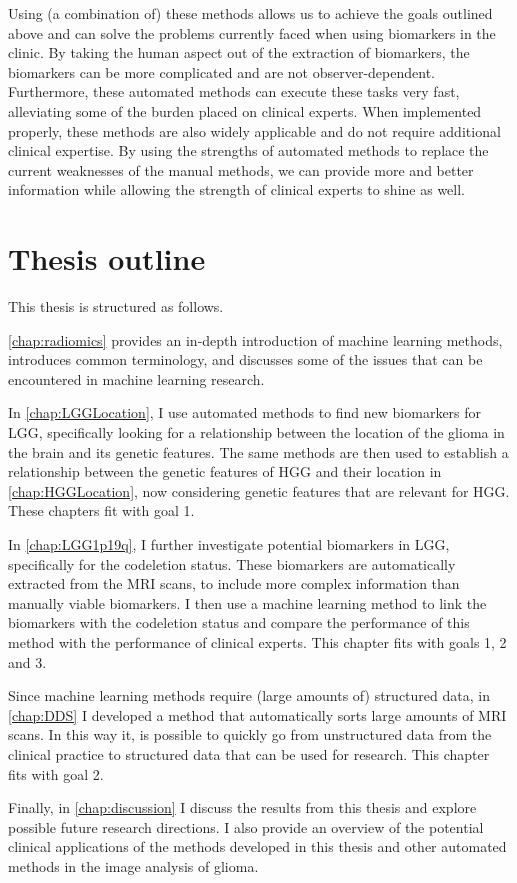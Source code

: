 Using (a combination of) these methods allows us to achieve the goals outlined above and can solve the problems currently faced when using biomarkers in the clinic.
By taking the human aspect out of the extraction of biomarkers, the biomarkers can be more complicated and are not observer-dependent.
Furthermore, these automated methods can execute these tasks very fast, alleviating some of the burden placed on clinical experts.
When implemented properly, these methods are also widely applicable and do not require additional clinical expertise.
By using the strengths of automated methods to replace the current weaknesses of the manual methods, we can provide more and better information while allowing the strength of clinical experts to shine as well.

\section{Thesis outline}

This thesis is structured as follows.

\cref{chap:radiomics} provides an in-depth introduction of machine learning methods, introduces common terminology, and discusses some of the issues that can be encountered in machine learning research.

In \cref{chap:LGGLocation}, I use automated methods to find new biomarkers for \gls{LGG}, specifically looking for a relationship between the location of the \gls{glioma} in the brain and its genetic features.
The same methods are then used to establish a relationship between the genetic features of \gls{HGG} and their location in \cref{chap:HGGLocation}, now considering genetic features that are relevant for \gls{HGG}.
These chapters fit with goal 1.

In \cref{chap:LGG1p19q}, I further investigate potential biomarkers in \gls{LGG}, specifically for the \gls{codeletion} status.
These biomarkers are automatically extracted from the \gls{MRI} scans, to include more complex information than manually viable biomarkers.
I then use a machine learning method to link the biomarkers with the \gls{codeletion} status and compare the performance of this method with the performance of clinical experts.
This chapter fits with goals 1, 2 and 3.

Since machine learning methods require (large amounts of) structured data, in \cref{chap:DDS} I developed a method that automatically sorts large amounts of \gls{MRI} scans.
In this way it, is possible to quickly go from unstructured data from the clinical practice to structured data that can be used for research.
This chapter fits with goal 2.

Finally, in \cref{chap:discussion} I discuss the results from this thesis and explore possible future research directions.
I also provide an overview of the potential clinical applications of the methods developed in this thesis and other automated methods in the image analysis of glioma.

